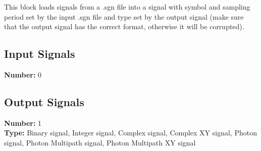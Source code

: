 This block loads signals from a .sgn file into a signal with symbol and sampling period set by the input .sgn file and type set by the output signal (make sure that the output signal has the correct format, otherwise it will be corrupted).

\subsection*{Input Signals}

\textbf{Number:} 0

\subsection*{Output Signals}

\textbf{Number:} 1\\
\textbf{Type:} Binary signal, Integer signal, Complex signal, Complex XY signal, Photon signal,  Photon Multipath signal,  Photon Multipath XY signal

